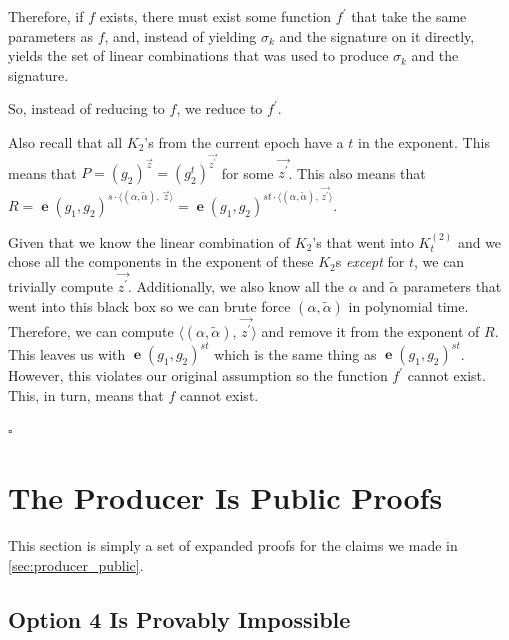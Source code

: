 \documentclass[pdftex,12pt,a4papaer,twoside,notitlepage]{report}
\DeclareMathOperator{\e}{\mathbf{e}}
\newcommand{\iprod}[2]{\langle #1,\,#2\rangle}
\begin{document}
\begin{appendices}
Therefore, if $f$ exists, there must exist some function $f^\prime$ that take
the same parameters as $f$, and, instead of yielding $\sigma_k$ and the
signature on it directly, yields the set of linear combinations that was used to
produce $\sigma_k$ and the signature.

So, instead of reducing to $f$, we reduce to $f^\prime$.

Also recall that all $K_2$'s from the current epoch have a $t$ in the exponent.
This means that $P = (g_2)^{\vec{z}} = (g_2^t)^{\vec{z^\prime}}$ for some
$\vec{z^\prime}$. This also means that $R = \e(g_1, g_2)^{s \cdot
  \iprod{(\alpha, \tilde{\alpha})}{\vec{z}}} = \e(g_1, g_2)^{st \cdot
  \iprod{(\alpha, \tilde{\alpha})}{\vec{z^\prime}}}$.

Given that we know the linear combination of $K_2$'s that went into $K^{(2)}_t$
and we chose all the components in the exponent of these $K_2$s \emph{except}
for $t$, we can trivially compute $\vec{z^\prime}$. Additionally, we also know
all the $\alpha$ and $\tilde{\alpha}$ parameters that went into this black box
so we can brute force $(\alpha, \tilde{\alpha})$ in polynomial time. Therefore,
we can compute $\iprod{(\alpha, \tilde{\alpha})}{\vec{z^\prime}}$ and remove it
from the exponent of $R$. This leaves us with $\e(g_1, g_2)^{st}$ which is the
same thing as $\e(g_1, g_2)^{st}$. However, this violates our original
assumption so the function $f^\prime$ cannot exist. This, in turn, means that
$f$ cannot exist.

{\hfill $\square$}

\section{The Producer Is Public Proofs}

This section is simply a set of expanded proofs for the claims we made in
\cref{sec:producer_public}.

\subsection{Option 4 Is Provably Impossible}
\label{proof:public-producer-4}


\end{appendices}
\end{document}
